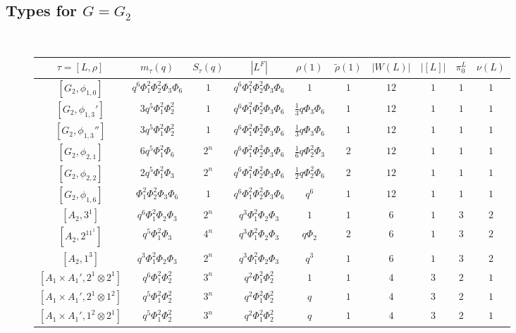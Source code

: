 \documentclass[12pt]{amsart}
\theoremstyle{plain}
\theoremstyle{definition}
\theoremstyle{remark}
\begin{document}
\begin{landscape}
\subsection{Types for $G=G_2$}\ 
\null\vfill
\begin{figure}[h]
\centering
\begin{tabular}{|c|cc|ccccccc|} 
\hline
$\tau=[L,\rho]$ & $m_\tau(q)$ & $S_\tau(q)$ & $|L^F|$ & $\rho(1)$ & $\tilde{\rho}(1)$ & $|W(L)|$ & $|[L]|$ & $\pi_0^L$ & $\nu(L)$ \\
\hline 
$[G_2,\phi_{1,0}]$ & $q^6\Phi_1^2\Phi_2^2\Phi_3\Phi_6$ & $1$ & $q^6\Phi_1^2\Phi_2^2\Phi_3\Phi_6$ & $1$ & $1$ & $12$ & $1$ & $1$ & $1$ \\
$[G_2,\phi_{1,3}']$ & $3q^5\Phi_1^2\Phi_2^2$ & $1$ & $q^6\Phi_1^2\Phi_2^2\Phi_3\Phi_6$ & $\frac{1}{3}q\Phi_3\Phi_6$ & $1$ & $12$ & $1$ & $1$ & $1$ \\
$[G_2,\phi_{1,3}'']$ & $3q^5\Phi_1^2\Phi_2^2$ & $1$ & $q^6\Phi_1^2\Phi_2^2\Phi_3\Phi_6$ & $\frac{1}{3}q\Phi_3\Phi_6$ & $1$ & $12$ & $1$ & $1$ & $1$ \\
$[G_2,\phi_{2,1}]$ & $6q^5\Phi_1^2\Phi_6$ & $2^n$ & $q^6\Phi_1^2\Phi_2^2\Phi_3\Phi_6$ & $\frac{1}{6}q\Phi_2^2\Phi_3$ & $2$ & $12$ & $1$ & $1$ & $1$ \\
$[G_2,\phi_{2,2}]$ & $2q^5\Phi_1^2\Phi_3$ & $2^n$ & $q^6\Phi_1^2\Phi_2^2\Phi_3\Phi_6$ & $\frac{1}{2}q\Phi_2^2\Phi_6$ & $2$ & $12$ & $1$ & $1$ & $1$ \\
$[G_2,\phi_{1,6}]$ & $\Phi_1^2\Phi_2^2\Phi_3\Phi_6$ & $1$ & $q^6\Phi_1^2\Phi_2^2\Phi_3\Phi_6$ & $q^6$ & $1$ & $12$ & $1$ & $1$ & $1$ \\
$[{A_2},3^1]$ & $q^6\Phi_1^2\Phi_2\Phi_3$ & $2^n$ & $q^3\Phi_1^2\Phi_2\Phi_3$ & $1$ & $1$ & $6$ & $1$ & $3$ & $2$ \\
$[{A_2},2^11^1]$ & $q^5\Phi_1^2\Phi_3$ & $4^n$ & $q^3\Phi_1^2\Phi_2\Phi_3$ & $q\Phi_2$ & $2$ & $6$ & $1$ & $3$ & $2$ \\
$[{A_2},1^3]$ & $q^3\Phi_1^2\Phi_2\Phi_3$ & $2^n$ & $q^3\Phi_1^2\Phi_2\Phi_3$ & $q^3$ & $1$ & $6$ & $1$ & $3$ & $2$ \\
$[{A_1\times A_1'},2^1\otimes2^1]$ & $q^6\Phi_1^2\Phi_2^2$ & $3^n$ & $q^2\Phi_1^2\Phi_2^2$ & $1$ & $1$ & $4$ & $3$ & $2$ & $1$ \\
$[{A_1\times A_1'},2^1\otimes1^2]$ & $q^5\Phi_1^2\Phi_2^2$ & $3^n$ & $q^2\Phi_1^2\Phi_2^2$ & $q$ & $1$ & $4$ & $3$ & $2$ & $1$ \\
$[{A_1\times A_1'},1^2\otimes2^1]$ & $q^5\Phi_1^2\Phi_2^2$ & $3^n$ & $q^2\Phi_1^2\Phi_2^2$ & $q$ & $1$ & $4$ & $3$ & $2$ & $1$ \\

\end{tabular}
\end{figure}
\end{landscape}
\end{document}
